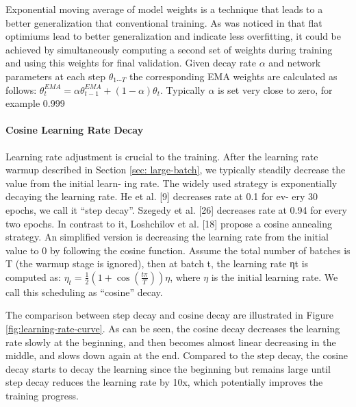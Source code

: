 Exponential moving average of model weights \cite{izmailov2018_averaging_swa_ema} is a technique that leads to a better generalization that conventional training. As was noticed in \cite{garipov2018_loss_surfaces} that flat optimiums lead to better generalization and indicate less overfitting, it could be achieved by simultaneously computing a second set of weights during training and using this weights for final validation. Given decay rate $\alpha$ and network parameters at each step $\theta_{1 \cdots T}$ the corresponding EMA weights are calculated as follows: $\theta_{t}^{EMA} = \alpha \theta_{t-1}^{EMA} + (1 - \alpha) \theta_{t} $. Typically $\alpha$ is set very close to zero, for example 0.999 \cite{tan2021_efficientnetv2} 

\paragraph{Cosine Learning Rate Decay}

Learning rate adjustment is crucial to the training. After the learning rate warmup described in Section \ref{sec: large-batch}, we typically steadily decrease the value from the initial learn- ing rate. The widely used strategy is exponentially decaying the learning rate. He et al. [9] decreases rate at 0.1 for ev- ery 30 epochs, we call it “step decay”. Szegedy et al. [26] decreases rate at 0.94 for every two epochs.
In contrast to it, Loshchilov et al. [18] propose a cosine annealing strategy. An simplified version is decreasing the learning rate from the initial value to 0 by following the cosine function. Assume the total number of batches is T (the warmup stage is ignored), then at batch t, the learning rate ηt is computed as:
$\eta_{t}=\frac{1}{2}\left(1+\cos \left(\frac{t \pi}{T}\right)\right) \eta$, where $\eta$ is the initial learning rate. We call this scheduling as “cosine” decay.

The comparison between step decay and cosine decay are illustrated in Figure \ref{fig:learning-rate-curve}. As can be seen, the cosine decay decreases the learning rate slowly at the beginning, and then becomes almost linear decreasing in the middle, and slows down again at the end. Compared to the step decay, the cosine decay starts to decay the learning since the beginning but remains large until step decay reduces the learning rate by 10x, which potentially improves the training progress.

